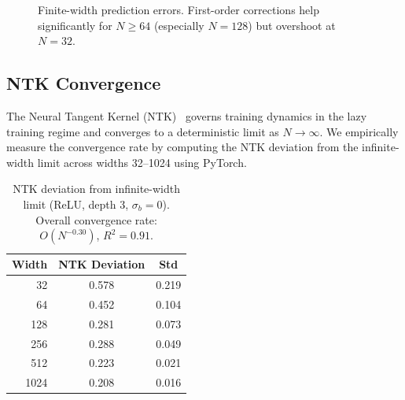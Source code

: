 \documentclass[10pt]{article}
\begin{document}
\begin{figure}[t]
\centering
{}
\caption{Finite-width prediction errors.  First-order corrections help significantly for $N \geq 64$ (especially $N\!=\!128$) but overshoot at $N\!=\!32$.}
\label{fig:finite-width}
\end{figure}

\subsection{NTK Convergence}
\label{sec:ntk}

The Neural Tangent Kernel (NTK)~\cite{jacot2018neural} governs training dynamics in the lazy training regime and converges to a deterministic limit as $N \to \infty$.
We empirically measure the convergence rate by computing the NTK deviation from the infinite-width limit across widths 32--1024 using PyTorch.

\begin{table}[t]
\centering
\caption{NTK deviation from infinite-width limit (ReLU, depth 3, $\sigma_b=0$).  Overall convergence rate: $O(N^{-0.30})$, $R^2 = 0.91$.}
\label{tab:ntk}
\small
\begin{tabular}{@{}rcc@{}}
\toprule
\textbf{Width} & \textbf{NTK Deviation} & \textbf{Std} \\
\midrule
32   & 0.578 & 0.219 \\
64   & 0.452 & 0.104 \\
128  & 0.281 & 0.073 \\
256  & 0.288 & 0.049 \\
512  & 0.223 & 0.021 \\
1024 & 0.208 & 0.016 \\
\bottomrule
\end{tabular}
\end{table}
\end{document}
